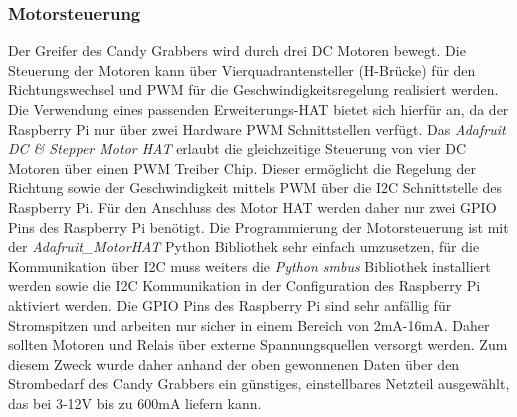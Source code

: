 \documentclass[BMR,Bachelor,ngerman]{twbook}%
\begin{document}
\subsubsection{Motorsteuerung}
Der Greifer des Candy Grabbers wird durch drei DC Motoren bewegt. Die Steuerung der Motoren kann über Vierquadrantensteller (H-Brücke) für den Richtungswechsel und \ac{PWM} für die Geschwindigkeitsregelung realisiert werden.  Die Verwendung eines passenden Erweiterungs-HAT bietet sich hierfür an, da der Raspberry Pi nur über zwei Hardware \ac{PWM} Schnittstellen verfügt. Das \emph{Adafruit DC \& Stepper Motor HAT} \cite{adafruit2018} erlaubt die gleichzeitige Steuerung von vier DC Motoren über einen \ac{PWM} Treiber Chip. Dieser ermöglicht die Regelung der Richtung sowie der Geschwindigkeit mittels \ac{PWM} über die \ac{I2C} Schnittstelle des Raspberry Pi. Für den Anschluss des Motor HAT werden daher nur zwei \ac{GPIO} Pins des Raspberry Pi benötigt. Die Programmierung der Motorsteuerung ist mit der \emph{Adafruit\_MotorHAT} Python Bibliothek sehr einfach umzusetzen, für die Kommunikation über \ac{I2C} muss weiters die \emph{Python smbus} Bibliothek installiert werden sowie die \ac{I2C} Kommunikation in der Configuration des Raspberry Pi aktiviert werden.  Die \ac{GPIO} Pins des Raspberry Pi sind sehr anfällig für Stromspitzen und arbeiten nur sicher in einem Bereich von 2mA-16mA. Daher sollten Motoren und Relais über externe Spannungsquellen versorgt werden. Zum diesem Zweck wurde daher anhand der oben gewonnenen Daten über den Strombedarf des Candy Grabbers ein günstiges, einstellbares Netzteil ausgewählt, das bei 3-12V bis zu 600mA liefern kann. %
%
\end{document}
